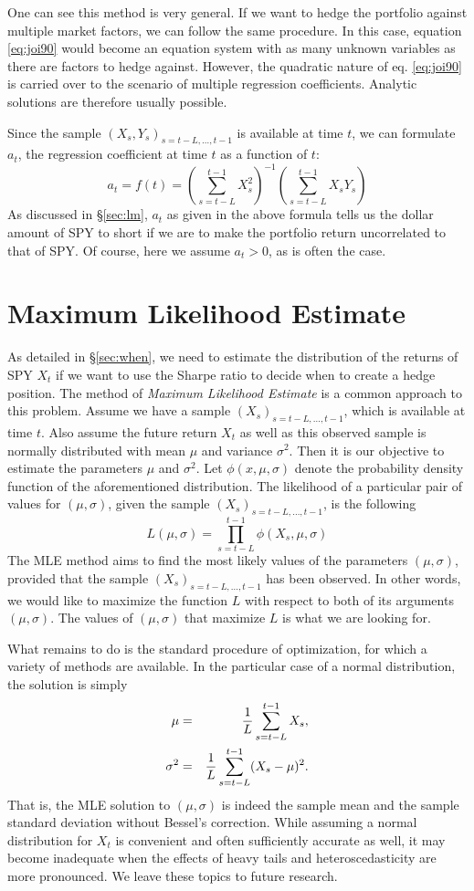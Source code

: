 \documentclass{article}
\begin{document}
One can see this method is very general. If we want to hedge the
portfolio against multiple market factors, we can follow the same
procedure. In this case, equation \eqref{eq:joi90} would become an
equation system with as many unknown variables as there are factors to
hedge against. However, the quadratic nature of eq. \eqref{eq:joi90}
is carried over to the scenario of multiple regression
coefficients. Analytic solutions are therefore usually possible.

Since the sample $(X_s, Y_s)_{s=t-L, \dots, t-1}$ is available at time
$t$, we can formulate $a_t$, the regression coefficient at time $t$ as
a function of $t$:
\[
  a_t = f(t) = \left(
    \sum_{s=t-L}^{t-1} X_s^2
  \right)^{-1}
  \left(
    \sum_{s=t-L}^{t-1} X_s Y_s
  \right)
\]
As discussed in \S\ref{sec:lm}, $a_t$ as given in the above formula
tells us the dollar amount of SPY to short if we are to make the
portfolio return uncorrelated to that of SPY. Of course, here we
assume $a_t > 0$, as is often the case.

\section{Maximum Likelihood Estimate}\label{sec:mle}
As detailed in \S\ref{sec:when}, we need to estimate the distribution
of the returns of SPY $X_t$ if we want to use the Sharpe ratio to decide
when to create a hedge position. The method of {\it Maximum Likelihood
Estimate} is a common approach to this problem. Assume we have a
sample $(X_s)_{s = t-L, \dots, t-1}$, which is available at time
$t$. Also assume the future return $X_t$ as well as this observed
sample is normally distributed with mean $\mu$ and variance
$\sigma^2$. Then it is our objective to estimate the parameters $\mu$
and $\sigma^2$. Let $\phi(x, \mu, \sigma)$ denote the probability
density function of the aforementioned distribution. The likelihood of
a particular pair of values for $(\mu, \sigma)$, given the sample
$(X_s)_{s = t-L, \dots, t-1}$, is the following
\[
  L(\mu, \sigma) = \prod_{s=t-L}^{t-1} \phi(X_s, \mu, \sigma)
\]
The MLE method aims to find the most likely values of the parameters
$(\mu, \sigma)$, provided that the sample $(X_s)_{s = t-L, \dots,
  t-1}$ has been observed. In other words, we would like to maximize
the function $L$ with respect to both of its arguments
$(\mu, \sigma)$. The values of $(\mu, \sigma)$ that maximize $L$ is
what we are looking for.

What remains to do is the standard procedure of optimization, for
which a variety of methods are available. In the particular case of
a normal distribution, the solution is simply
\begin{eqnarray*}
  \mu &=& {1 \over L} \sum_{s=t-L}^{t-1} X_s, \\
  \sigma^2 &=& {1 \over L} \sum_{s=t-L}^{t-1} (X_s - \mu)^2.
\end{eqnarray*}
That is, the MLE solution to $(\mu, \sigma)$ is indeed the sample mean
and the sample standard deviation without Bessel's correction.
While assuming a normal distribution for $X_t$ is convenient and often
sufficiently accurate as well, it may become inadequate when the
effects of heavy tails and heteroscedasticity are more pronounced. We
leave these topics to future research.
\end{document}

